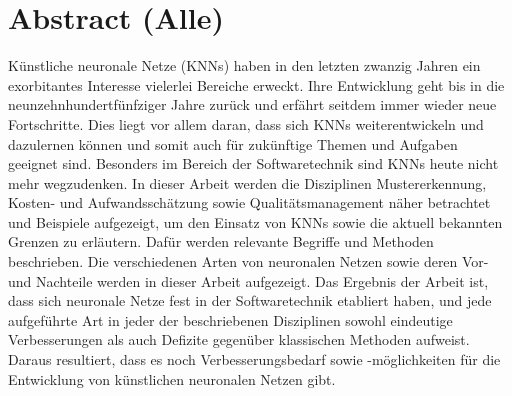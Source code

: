 \section*{Abstract (Alle)}
Künstliche neuronale Netze (KNNs) haben in den letzten zwanzig Jahren ein exorbitantes Interesse vielerlei Bereiche erweckt. Ihre Entwicklung geht bis in die neunzehnhundertfünfziger Jahre zurück und erfährt seitdem immer wieder neue Fortschritte. Dies liegt vor allem daran, dass sich KNNs weiterentwickeln und dazulernen können und somit auch für zukünftige Themen und Aufgaben geeignet sind. Besonders im Bereich der Softwaretechnik sind KNNs heute nicht mehr wegzudenken. In dieser Arbeit werden die Disziplinen Mustererkennung, Kosten- und Aufwandsschätzung sowie Qualitätsmanagement näher betrachtet und Beispiele aufgezeigt, um den Einsatz von KNNs sowie die aktuell bekannten Grenzen zu erläutern. Dafür werden relevante Begriffe und Methoden beschrieben. Die verschiedenen Arten von neuronalen Netzen sowie deren Vor- und Nachteile werden in dieser Arbeit aufgezeigt. Das Ergebnis der Arbeit ist, dass sich neuronale Netze fest in der Softwaretechnik etabliert haben, und jede aufgeführte Art in jeder der beschriebenen Disziplinen sowohl eindeutige Verbesserungen als auch Defizite gegenüber klassischen Methoden aufweist. Daraus resultiert, dass es noch Verbesserungsbedarf sowie -möglichkeiten für die Entwicklung von künstlichen neuronalen Netzen gibt.